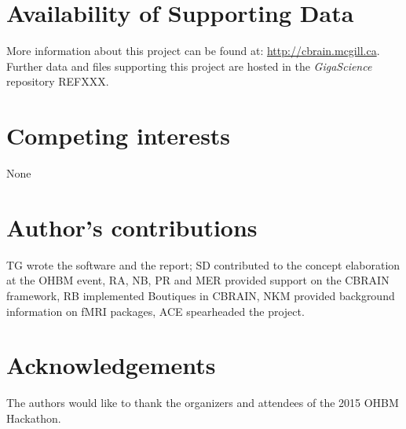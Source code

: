 \documentclass[twocolumn]{bmcart}%
\begin{document}
\begin{backmatter}

\section*{Availability of Supporting Data}
More information about this project can be found at: \url{http://cbrain.mcgill.ca}. Further data and files supporting this project are hosted in the \emph{GigaScience} repository REFXXX.

\section*{Competing interests}
None

\section*{Author's contributions}
TG wrote the software and the report; SD contributed to the concept
elaboration at the OHBM event, RA, NB, PR and MER provided support on
the CBRAIN framework, RB implemented Boutiques in CBRAIN, NKM provided
background information on fMRI packages, ACE spearheaded the project.

\section*{Acknowledgements}
The authors would like to thank the organizers and attendees of the 2015
OHBM Hackathon.

  
  


\end{backmatter}
\end{document}
